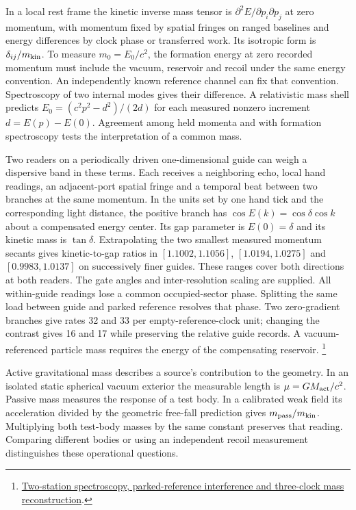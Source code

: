 \documentclass[11pt]{article}
\begin{document}
In a local rest frame the kinetic inverse mass tensor is
$\partial^2 E/\partial p_i\partial p_j$ at zero momentum, with momentum
fixed by spatial fringes on ranged baselines and energy differences
by clock phase or transferred work. Its isotropic form is
$\delta_{ij}/m_{\rm kin}$. To measure $m_0=E_0/c^2$, the formation
energy at zero recorded momentum must include the vacuum, reservoir
and recoil under the same energy convention. An independently known
reference channel can fix that convention. Spectroscopy of two
internal modes gives their difference. A relativistic mass shell
predicts $E_0=(c^2p^2-d^2)/(2d)$ for each measured nonzero increment
$d=E(p)-E(0)$. Agreement among held momenta and with formation
spectroscopy tests the interpretation of a common mass.

Two readers on a periodically driven one-dimensional guide can weigh a
dispersive band in these terms. Each receives a neighboring echo,
local hand readings, an adjacent-port spatial fringe and a temporal
beat between two branches at the same momentum. In the units set by
one hand tick and the corresponding light distance, the positive
branch has $\cos E(k)=\cos\delta\cos k$ about a compensated energy
center. Its gap parameter is $E(0)=\delta$ and its kinetic mass
is $\tan\delta$. Extrapolating the two smallest measured momentum
secants gives kinetic-to-gap ratios in $[1.1002,1.1056]$,
$[1.0194,1.0275]$ and $[0.9983,1.0137]$ on successively finer
guides. These ranges cover both directions at both readers. The gate
angles and inter-resolution scaling are supplied. All within-guide
readings lose a common occupied-sector phase. Splitting the same load
between guide and parked reference resolves that phase. Two
zero-gradient branches give rates 32 and 33 per empty-reference-clock
unit; changing the contrast gives 16 and 17 while preserving the
relative guide records. A vacuum-referenced particle mass requires
the energy of the compensating reservoir.%
\footnote{\href{https://github.com/FloatingPragma/observer-patch-holography/tree/main/code/matched_einstein_limit/record_masses}{Two-station spectroscopy, parked-reference interference and three-clock mass reconstruction}.}

Active gravitational mass describes a source's contribution to the
geometry. In an isolated static spherical vacuum exterior the
measurable length is $\mu=GM_{\rm act}/c^2$. Passive mass measures
the response of a test body. In a calibrated weak field its
acceleration divided by the geometric free-fall prediction gives
$m_{\rm pass}/m_{\rm kin}$. Multiplying both test-body masses by the
same constant preserves that reading. Comparing different bodies or
using an independent recoil measurement distinguishes these
operational questions.
\end{document}
